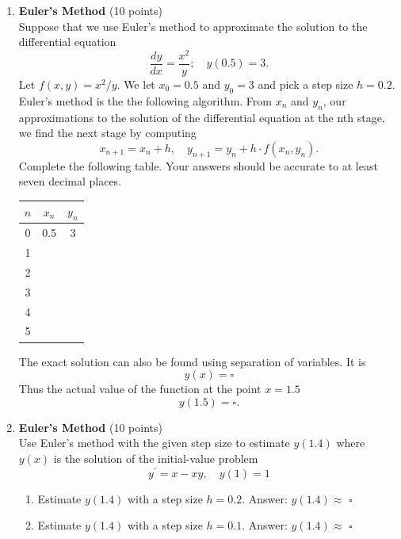 \begin{enumerate}
  \item \textbf{Euler's Method} (10 points)\\
  Suppose that we use Euler's method to approximate the solution to the differential equation
  $$
  \frac{d y}{d x}=\frac{x^2}{y} ; \quad y(0.5)=3 .
  $$
  Let $f(x, y)=x^2 / y$.
  We let $x_0=0.5$ and $y_0=3$ and pick a step size $h=0.2$. Euler's method is the the following algorithm. From $x_n$ and $y_n$, our approximations to the solution of the differential equation at the nth stage, we find the next stage by computing
  $$
  x_{n+1}=x_n+h, \quad y_{n+1}=y_n+h \cdot f\left(x_n, y_n\right) .
  $$
  Complete the following table. Your answers should be accurate to at least seven decimal places.
  \begin{tabular}{|c|c|c|}
  \hline$n$ & $x_n$ & $y_n$ \\
  \hline 0 & 0.5 & 3 \\
  \hline 1 & & \\
  \hline 2 & & \\
  \hline 3 & & \\
  \hline 4 & & \\
  \hline 5 & & \\
  \hline
  \end{tabular}
  The exact solution can also be found using separation of variables. It is
  $$
  y(x)=\square
  $$
  Thus the actual value of the function at the point $x=1.5$
  $$
  y(1.5)=\square .
  $$
  \begin{subanswer}
  \end{subanswer}

  \item \textbf{Euler's Method} (10 points)\\
  Use Euler's method with the given step size to estimate $y(1.4)$ where $y(x)$ is the solution of the initial-value problem
  $$
  y^{\prime}=x-x y, \quad y(1)=1
  $$
  \begin{enumerate}[label=(\alph*)]
    \item Estimate $y(1.4)$ with a step size $h=0.2$.
    Answer: $y(1.4) \approx$ $\square$
    \begin{subanswer}
    \end{subanswer}
    \item Estimate $y(1.4)$ with a step size $h=0.1$.
    Answer: $y(1.4) \approx$ $\square$
    \begin{subanswer}
    \end{subanswer}
  \end{enumerate}


\end{enumerate}
